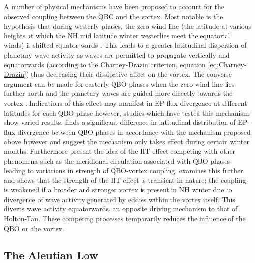A number of physical mechanisms have been proposed to account for the observed coupling between the QBO and the vortex. Most notable is the hypothesis that during westerly phases, the zero wind line (the latitude at various heights at which the NH mid latitude winter westerlies meet the equatorial winds) is shifted equator-wards \citep{HoltonJamesRTan1980}. This leads to a greater latitudinal dispersion of planetary wave activity as waves are permitted to propagate vertically and equatorwards (according to the Charney-Drazin criterion, equation \ref{eq:Charney-Drazin}) thus decreasing their dissipative affect on the vortex. The converse argument can be made for easterly QBO phases when the zero-wind line lies further north and the planetary waves are guided more directly towards the vortex \cite{luMechanisms2014}. Indications of this effect may manifest in EP-flux divergence at different latitudes for each QBO phase however, studies which have tested this mechanism show varied results. \cite{Hamilton} finds a significant difference in latitudinal distribution of EP-flux divergence between QBO phases in accordance with the mechanism proposed above however \cite{Hu2002} and \cite{Gray2004} suggest the mechanism only takes effect during certain winter months. Furthermore \citep{Garfinkel12} present the idea of the HT effect competing with other phenomena such as the meridional circulation associated with QBO phases leading to variations in strength of QBO-vortex coupling. \cite{luMechanisms2014} examines this further and shows that the strength of the HT effect is transient in nature; the coupling is weakened if a broader and stronger vortex is present in NH winter due to divergence of wave activity generated by eddies within the vortex itself. This diverts wave activity equatorwards, an opposite driving mechanism to that of Holton-Tan. These competing processes temporarily reduces the influence of the QBO on the vortex.

\subsection{The Aleutian Low}
\label{sec:external_influence_AL}

